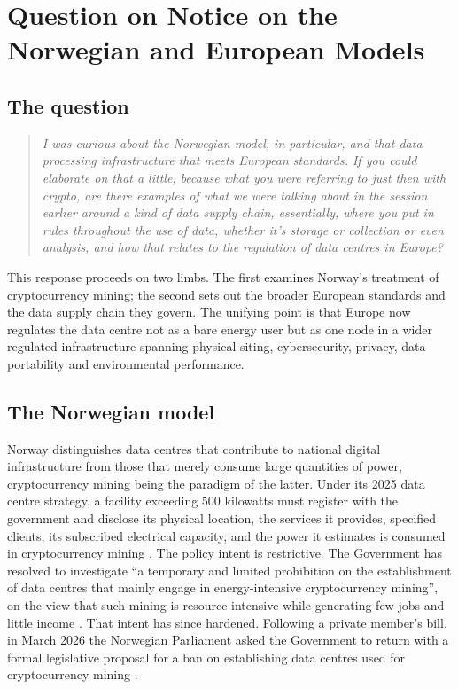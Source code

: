 \chapter{Question on Notice on the Norwegian and European Models}
\label{ch:supp:qon}

\section{The question}
\label{sec:supp:qon:q}

\begin{quote}
\itshape
I was curious about the Norwegian model, in particular, and that data processing infrastructure that meets European standards. If you could elaborate on that a little, because what you were referring to just then with crypto, are there examples of what we were talking about in the session earlier around a kind of data supply chain, essentially, where you put in rules throughout the use of data, whether it's storage or collection or even analysis, and how that relates to the regulation of data centres in Europe?
\end{quote}

This response proceeds on two limbs. The first examines Norway's treatment of cryptocurrency mining; the second sets out the broader European standards and the data supply chain they govern. The unifying point is that Europe now regulates the data centre not as a bare energy user but as one node in a wider regulated infrastructure spanning physical siting, cybersecurity, privacy, data portability and environmental performance.

\section{The Norwegian model}
\label{sec:supp:qon:norway}

Norway distinguishes data centres that contribute to national digital infrastructure from those that merely consume large quantities of power, cryptocurrency mining being the paradigm of the latter. Under its 2025 data centre strategy, a facility exceeding 500 kilowatts must register with the government and disclose its physical location, the services it provides, specified clients, its subscribed electrical capacity, and the power it estimates is consumed in cryptocurrency mining \autocite{norwayDataCentreStrategy2025}. The policy intent is restrictive. The Government has resolved to investigate \enquote{a temporary and limited prohibition on the establishment of data centres that mainly engage in energy-intensive cryptocurrency mining}, on the view that such mining is resource intensive while generating few jobs and little income \autocite{norwayDataCentreStrategy2025}. That intent has since hardened. Following a private member's bill, in March 2026 the Norwegian Parliament asked the Government to return with a formal legislative proposal for a ban on establishing data centres used for cryptocurrency mining \autocite{schjodtNorwayCryptoResolutions2026}.

